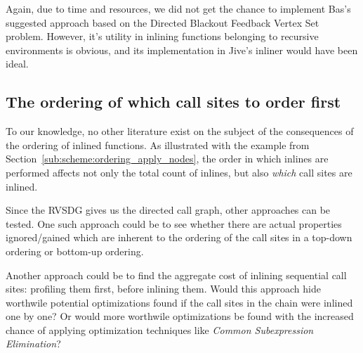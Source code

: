 Again, due to time and resources, we did not get the chance to implement Bas's
suggested approach based on the Directed Blackout Feedback Vertex Set problem.
However, it's utility in inlining functions belonging to recursive environments
is obvious, and its implementation in Jive's inliner would have been ideal.

\subsection{The ordering of which call sites to order first}
\label{sub:fw:call_site_visit_order}

To our knowledge, no other literature exist on the subject of the consequences
of the ordering of inlined functions. As illustrated with the example from
Section~\ref{sub:scheme:ordering_apply_nodes}, the order in which inlines are
performed affects not only the total count of inlines, but also \textit{which}
call sites are inlined.

Since the RVSDG gives us the directed call graph, other approaches can be
tested. One such approach could be to see whether there are actual properties
ignored/gained which are inherent to the ordering of the call sites in a
top-down ordering or bottom-up ordering.

Another approach could be to find the aggregate cost of inlining sequential call
sites: profiling them first, before inlining them. Would this approach hide
worthwile potential optimizations found if the call sites in the chain were
inlined one by one? Or would more worthwile optimizations be found with the
increased chance of applying optimization techniques like \textit{Common
Subexpression Elimination}?
